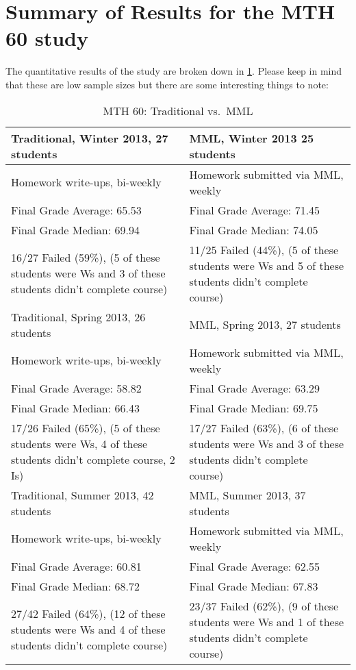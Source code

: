 \section{Summary of Results for the MTH 60 study}
The quantitative results of the study are broken down in \cref{app:tab:onlinehwstudy60}. 
Please keep in mind that these are low sample sizes but there are some interesting things to note: 
\begin{longtable}{p{}p{}}
	\caption{MTH 60: Traditional vs.\ MML}\label{app:tab:onlinehwstudy60}
	\\
	\toprule
	Traditional, Winter 2013, 27 students & MML, Winter 2013 25 students       \\
	\midrule
	Homework write-ups, bi-weekly         & Homework submitted via MML, weekly \\
	Final Grade Average:  65.53           & Final Grade Average:  71.45        \\
	Final Grade Median:  69.94            & Final Grade Median:  74.05         \\
	16/27 Failed (59\%), (5 of these students were Ws and 3 of these students didn't complete course)
	                                      &                                    
	11/25 Failed (44\%), (5 of these students were Ws and 5 of these students didn't complete course)\\
	\midrule
	Traditional, Spring 2013, 26 students & MML, Spring 2013, 27 students      \\
	\midrule
	Homework write-ups, bi-weekly         & Homework submitted via MML, weekly \\
	Final Grade Average:  58.82           & Final Grade Average:  63.29        \\
	Final Grade Median:  66.43            & Final Grade Median:  69.75         \\
	17/26 Failed (65\%), (5 of these students were 
	Ws, 4 of these students didn't complete course, 2 Is)
	                                      &                                    
	17/27 Failed (63\%), (6 of these students were Ws and 3 of these students didn't complete course) \\
	\midrule
	Traditional, Summer 2013, 42 students & MML, Summer 2013, 37 students      \\
	\midrule
	Homework write-ups, bi-weekly         & Homework submitted via MML, weekly \\
	Final Grade Average:  60.81           & Final Grade Average:  62.55        \\
	Final Grade Median:  68.72            & Final Grade Median:  67.83         \\
	27/42 Failed (64\%), (12 of these students were Ws and 4 of these students didn't complete course)
	                                      &                                    
	23/37 Failed (62\%), (9 of these students were Ws and 1 of these students didn't complete course) \\
	\bottomrule
\end{longtable}


